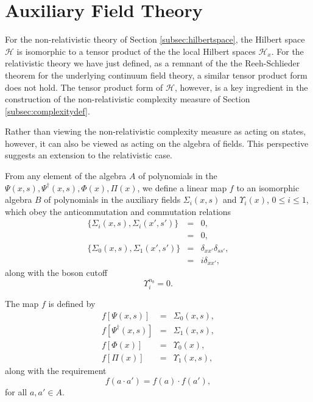 \documentclass[twocolumn,amsmath,amssymb]{revtex4-1}
\begin{document}
\section{\label{subsec:auxiliarya} Auxiliary Field Theory}


For the
non-relativistic theory of Section \ref{subsec:hilbertspace},
the Hilbert space $\mathcal{H}$ is isomorphic to a tensor
product of the 
the local Hilbert spaces $\mathcal{H}_x$.
For the relativistic theory we have just defined,
as a remnant of the 
the Reeh-Schlieder theorem for the underlying continuum field theory,
a similar tensor product form does not hold.
The tensor product form of $\mathcal{H}$,
however, is a key ingredient in the construction of the non-relativistic
complexity measure
of Section \ref{subsec:complexitydef}.


Rather than viewing the
non-relativistic complexity measure as acting on
states, however, it can also be viewed as acting on the algebra of fields.
This perspective suggests an extension to
the relativistic case.

From any element of the algebra $A$ of polynomials in the $\Psi( x, s), \Psi^\dagger( x, s), \Phi(x), \Pi(x)$, 
we define a linear map
$f$ to an isomorphic algebra $B$ of 
polynomials in the auxiliary fields $\Sigma_i( x, s)$ and $\Upsilon_i( x)$, $0 \le i \le 1$,
which obey the anticommutation and commutation relations
\begin{subequations}
\begin{eqnarray}
\label{anticommute4}
\{ \Sigma_i( x, s), \Sigma_i( x', s') \} & = & 0, \\
\label{commute4}
[ \Upsilon_i( x), \Upsilon_i( x')] & = & 0, \\
\label{anticommute5}
\{\Sigma_0( x, s),\Sigma_1( x', s') \} &=&  \delta_{xx'} \delta_{ss'}, \\
\label{commute5}
[\Upsilon_0( x),\Upsilon_1( x') ] & = &  i \delta_{xx'},
\end{eqnarray}
\end{subequations}
along with the boson cutoff
\begin{equation}
    \label{cutoff2}
    \Upsilon_i^{n_b} = 0.
\end{equation}

The map $f$ is defined by
\begin{subequations}
\begin{eqnarray}
\label{mappsi}
f[ \Psi( x, s)] &=& \Sigma_0( x, s), \\
\label{mappsibar}
f[\Psi^\dagger( x, s)] & = &  \Sigma_1( x, s), \\
\label{mapphi}
f[ \Phi( x)] &=& \Upsilon_0( x), \\
\label{mapphidag}
f[\Pi( x)] & = &  \Upsilon_1( x, s),
\end{eqnarray}
\end{subequations}
along with the requirement
\begin{equation}
\label{preserveprod}
f( a \cdot a')  =  f( a) \cdot f(a'), 
\end{equation}
for all $a, a' \in A$.
\end{document}
